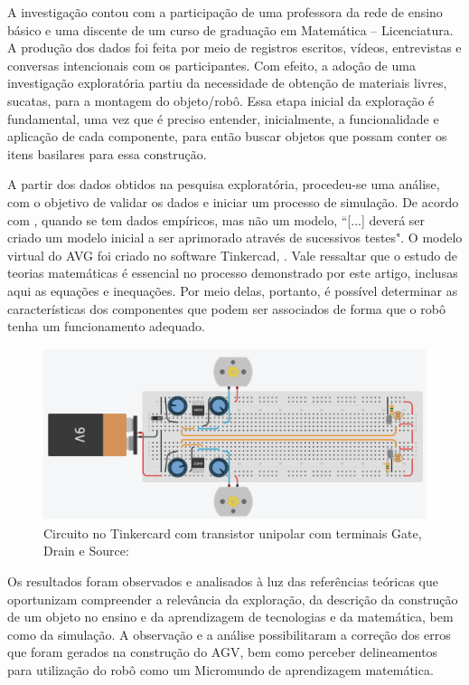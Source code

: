 \documentclass[portuguese]{textolivre}
\begin{document}
A investigação contou com a participação de uma professora da rede de ensino básico e uma discente de um curso de graduação em Matemática – Licenciatura. A produção dos dados foi feita por meio de registros escritos, vídeos, entrevistas e conversas intencionais com os participantes. Com efeito, a adoção de uma investigação exploratória partiu da necessidade de obtenção de materiais livres, sucatas, para a montagem do objeto/robô. Essa etapa inicial da exploração é fundamental, uma vez que é preciso entender, inicialmente, a funcionalidade e aplicação de cada componente, para então buscar objetos que possam conter os itens basilares para essa construção.

A partir dos dados obtidos na pesquisa exploratória, procedeu-se uma análise, com o objetivo de validar os dados e iniciar um processo de simulação. De acordo com \textcite[p. 4]{Vicente2005}, quando se tem dados empíricos, mas não um modelo, “[...] deverá ser criado um modelo inicial a ser aprimorado através de sucessivos testes". O modelo virtual do AVG foi criado no software Tinkercad, . Vale ressaltar que o estudo de teorias matemáticas é essencial no processo demonstrado por este artigo, inclusas aqui as equações e inequações. Por meio delas, portanto, é possível determinar as características dos componentes que podem ser associados de forma que o robô tenha um funcionamento adequado.

\begin{figure}[htbp]
\centering
\begin{minipage}{0.95\textwidth}
 \includegraphics[width=\textwidth]{figuras/figura 3.png}
 \caption{Circuito no Tinkercard com transistor unipolar com terminais Gate, Drain e Source:}
 \label{figura03}
\end{minipage}
\end{figure}

Os resultados foram observados e analisados à luz das referências teóricas que oportunizam compreender a relevância da exploração, da descrição da construção de um objeto no ensino e da aprendizagem de tecnologias e da matemática, bem como da simulação. A observação e a análise possibilitaram a correção dos erros que foram gerados na construção do AGV, bem como perceber delineamentos para utilização do robô como um Micromundo de aprendizagem matemática.
\end{document}

